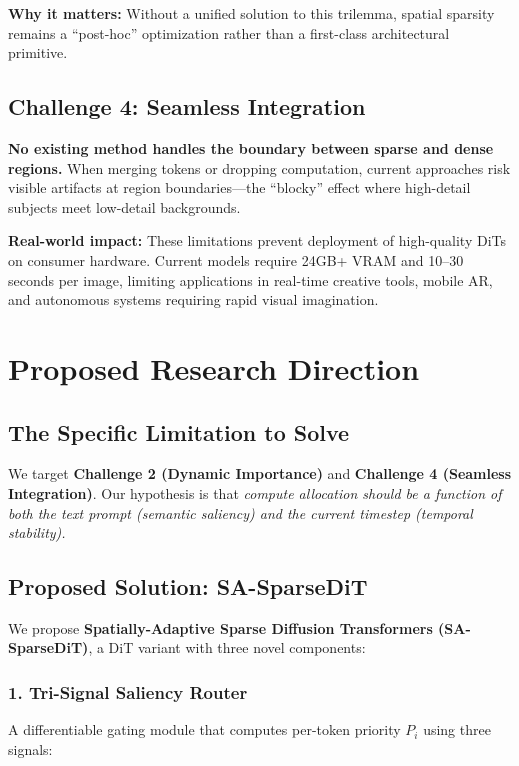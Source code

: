 \documentclass{article}
\begin{document}
\textbf{Why it matters:} Without a unified solution to this trilemma,
spatial sparsity remains a ``post-hoc'' optimization rather than a
first-class architectural primitive.

\subsection{Challenge 4: Seamless Integration}
\textbf{No existing method handles the boundary between sparse and dense
    regions.} When merging tokens or dropping computation, current approaches
risk visible artifacts at region boundaries—the ``blocky'' effect where
high-detail subjects meet low-detail backgrounds.

\textbf{Real-world impact:} These limitations prevent deployment of
high-quality DiTs on consumer hardware. Current models require 24GB+ VRAM
and 10--30 seconds per image, limiting applications in real-time creative
tools, mobile AR, and autonomous systems requiring rapid visual
imagination.

\section{Proposed Research Direction}
\subsection{The Specific Limitation to Solve}
We target \textbf{Challenge 2 (Dynamic Importance)} and \textbf{Challenge 4
    (Seamless Integration)}. Our hypothesis is that \textit{compute allocation
    should be a function of both the text prompt (semantic saliency) and the
    current timestep (temporal stability).}

\subsection{Proposed Solution: SA-SparseDiT}

We propose \textbf{Spatially-Adaptive Sparse Diffusion Transformers
    (SA-SparseDiT)}, a DiT variant with three novel components:

\subsubsection{1. Tri-Signal Saliency Router}
A differentiable gating module that computes per-token priority $P_i$ using
three signals:
\end{document}
